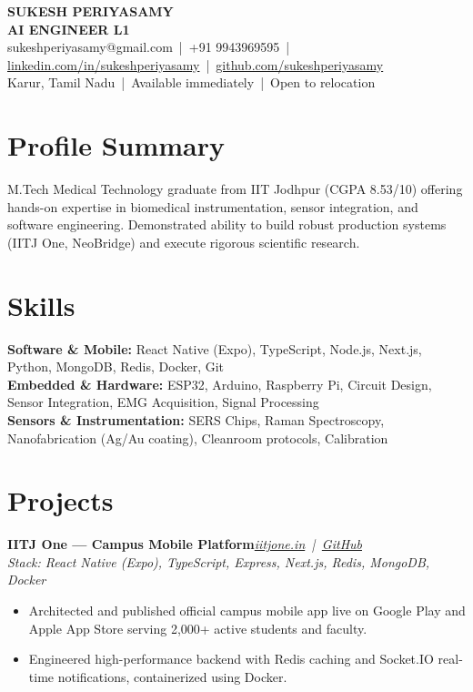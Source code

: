 \documentclass[9.2pt,a4paper]{article}
\newcommand{\role}[3]{\textbf{#1}\hfill\textit{#2}\\[-2pt]\textit{\small #3}\par}
\begin{document}
\begin{center}
{\huge\bfseries SUKESH PERIYASAMY}\\[1.5pt]
{\large\bfseries\color{accent} AI ENGINEER L1}\\[1.5pt]
\small sukeshperiyasamy@gmail.com \,|\, +91 9943969595 \,|\, \href{https://linkedin.com/in/sukeshperiyasamy}{linkedin.com/in/sukeshperiyasamy} \,|\, \href{https://github.com/sukeshperiyasamy}{github.com/sukeshperiyasamy}\\
Karur, Tamil Nadu \,|\, Available immediately \,|\, Open to relocation
\end{center}

\section{Profile Summary}
M.Tech Medical Technology graduate from IIT Jodhpur (CGPA 8.53/10) offering hands-on expertise in biomedical instrumentation, sensor integration, and software engineering. Demonstrated ability to build robust production systems (IITJ One, NeoBridge) and execute rigorous scientific research.

\section{Skills}
\textbf{Software \& Mobile:} React Native (Expo), TypeScript, Node.js, Next.js, Python, MongoDB, Redis, Docker, Git\\
\textbf{Embedded \& Hardware:} ESP32, Arduino, Raspberry Pi, Circuit Design, Sensor Integration, EMG Acquisition, Signal Processing\\
\textbf{Sensors \& Instrumentation:} SERS Chips, Raman Spectroscopy, Nanofabrication (Ag/Au coating), Cleanroom protocols, Calibration

\section{Projects}
\role{IITJ One --- Campus Mobile Platform}{\href{https://iitjone.in}{iitjone.in} \,|\, \href{https://github.com/Godevs04/IITJ_One}{GitHub}}{Stack: React Native (Expo), TypeScript, Express, Next.js, Redis, MongoDB, Docker}
\begin{itemize}
  \item Architected and published official campus mobile app live on Google Play and Apple App Store serving 2,000+ active students and faculty.
  \item Engineered high-performance backend with Redis caching and Socket.IO real-time notifications, containerized using Docker.
\end{itemize}
\end{document}
